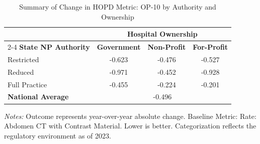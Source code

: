 \begin{table}[htbp]
    \centering
    \caption{Summary of Change in HOPD Metric: OP-10 by Authority and Ownership}
    \label{tab:d_hopd_op_10_own}
    \vspace{0.2cm}
    \begin{tabular}{lccc}
        \toprule
        & \multicolumn{3}{c}{\textbf{Hospital Ownership}} \\
        \cmidrule(lr){2-4}
        \textbf{State NP Authority} & \textbf{Government} & \textbf{Non-Profit} & \textbf{For-Profit} \\
        \midrule
        Restricted & -0.623 & -0.476 & -0.527 \\
        Reduced & -0.971 & -0.452 & -0.928 \\
        Full Practice & -0.455 & -0.224 & -0.201 \\
        \midrule
        \textbf{National Average} & \multicolumn{3}{c}{-0.496} \\
        \bottomrule
    \end{tabular}
    \vspace{0.1cm}
    \begin{minipage}{0.85\textwidth}
        \footnotesize \textit{Notes:} Outcome represents year-over-year absolute change. Baseline Metric: Rate: Abdomen CT with Contrast Material. Lower is better. Categorization reflects the regulatory environment as of 2023.
    \end{minipage}
\end{table}